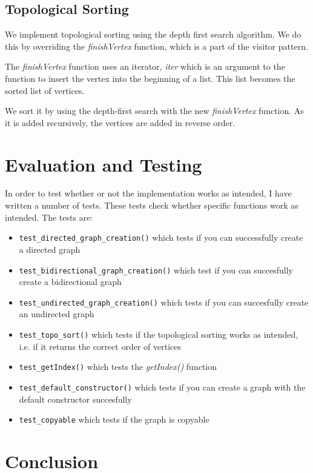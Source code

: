 \documentclass{article}
\begin{document}
\subsection{Topological Sorting}

We implement topological sorting using the depth first search algorithm.
We do this by overriding the \textit{finishVertex} function, which is 
a part of the visitor pattern. 

The \textit{finishVertex} function uses an iterator, \textit{iter} which 
is an argument to the function to insert the vertex into the beginning of
a list. This list becomes the sorted list of vertices. 

We sort it by using the depth-first search with the new \textit{finishVertex}
function. As it is added recursively, the vertices are added in reverse order.

\section{Evaluation and Testing}

In order to test whether or not the implementation works as intended, 
I have written a number of tests. 
These tests check whether specific functions work as intended. The 
tests are: 
\begin{itemize}
    \item \texttt{test\_directed\_graph\_creation()} which tests if you can successfully create a directed graph 
    \item \texttt{test\_bidirectional\_graph\_creation()} which test if you can succesfully create a bidirectional graph
    \item \texttt{test\_undirected\_graph\_creation()} which tests if you can succesfully create an undirected graph
    \item \texttt{test\_topo\_sort()} which tests if the topological sorting works as intended, i.e. if it returns the correct order of vertices
    \item \texttt{test\_getIndex()} which tests the \textit{getIndex()} function
    \item \texttt{test\_default\_constructor()} which tests if you can create a graph with the default constructor succesfully
    \item \texttt{test\_copyable} which tests if the graph is copyable
\end{itemize}



\section{Conclusion}
\end{document}
